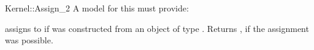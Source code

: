 \begin{ccRefFunctionObjectConcept}{Kernel::Assign_2}
A model for this must provide:


{assigns  to  if 
was constructed from an object of type .
Returns , if the assignment was possible.}

\ccIsModel{}

\ccSeeAlso
{}

\end{ccRefFunctionObjectConcept}
